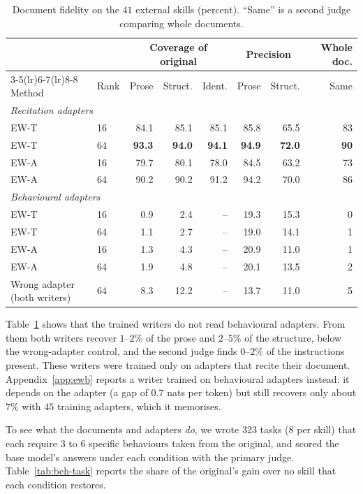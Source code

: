 \documentclass[11pt]{article}
\newcommand{\best}[1]{\textbf{#1}}
\newcommand{\EWT}{\textsc{EW-T}}
\newcommand{\EWA}{\textsc{EW-A}}
\begin{document}
\begin{table}[!htb]
\centering
\caption{Document fidelity on the $41$ external skills (percent). ``Same'' is a second judge comparing whole documents.}
\label{tab:beh-doc}
\small
\setlength{\tabcolsep}{4pt}
\begin{tabular}{llrrrrrr}
\toprule
 & & \multicolumn{3}{c}{Coverage of original} & \multicolumn{2}{c}{Precision} & Whole doc.\\
\cmidrule(lr){3-5}\cmidrule(lr){6-7}\cmidrule(lr){8-8}
Method & Rank & Prose & Struct. & Ident. & Prose & Struct. & Same\\
\midrule
\multicolumn{8}{l}{\emph{Recitation adapters}}\\
\EWT{} & 16 & 84.1 & 85.1 & 85.1 & 85.8 & 65.5 & 83\\
\EWT{} & 64 & \best{93.3} & \best{94.0} & \best{94.1} & \best{94.9} & \best{72.0} & \best{90}\\
\EWA{} & 16 & 79.7 & 80.1 & 78.0 & 84.5 & 63.2 & 73\\
\EWA{} & 64 & 90.2 & 90.2 & 91.2 & 94.2 & 70.0 & 86\\
\midrule
\multicolumn{8}{l}{\emph{Behavioural adapters}}\\
\EWT{} & 16 & 0.9 & 2.4 & -- & 19.3 & 15.3 & 0\\
\EWT{} & 64 & 1.1 & 2.7 & -- & 19.0 & 14.1 & 1\\
\EWA{} & 16 & 1.3 & 4.3 & -- & 20.9 & 11.0 & 1\\
\EWA{} & 64 & 1.9 & 4.8 & -- & 20.1 & 13.5 & 2\\
\midrule
Wrong adapter (both writers) & 64 & 8.3 & 12.2 & -- & 13.7 & 11.0 & 5\\
\bottomrule
\end{tabular}
\end{table}

Table~\ref{tab:beh-doc} shows that the trained writers do not read behavioural adapters. From them both writers recover $1$--$2\%$ of the prose
and $2$--$5\%$ of the structure, below the wrong-adapter control, and the second judge finds $0$--$2\%$ of the instructions present. These writers
were trained only on adapters that recite their document. Appendix~\ref{app:ewb} reports a writer trained on behavioural adapters instead: it
depends on the adapter (a gap of $0.7$ nats per token) but still recovers only about $7\%$ with $45$ training adapters, which it memorises.

To see what the documents and adapters \emph{do}, we wrote $323$ tasks ($8$ per skill) that each require $3$ to $6$ specific behaviours taken from
the original, and scored the base model's answers under each condition with the primary judge. Table~\ref{tab:beh-task} reports the share of the
original's gain over no skill that each condition restores.
\end{document}
